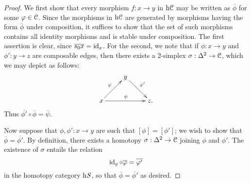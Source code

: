\begin{1.2.3 The homotopy category}
\begin{proof}
We first show that every morphism $f: x \rightarrow y$ in $\rm{h} \it{\operatorname{\mathcal{C}}}$ may be written as $\overline{\phi}$ for some $\varphi \in \operatorname{\mathcal{C}}$. Since the morphisms in $\rm{h} \it{\operatorname{\mathcal{C}}}$ are generated by morphisms having the form $\overline{\phi}$ under composition, it suffices to show that the set of such morphisms contains all identity morphisms and is stable under composition. The first assertion is clear, since $\overline{ s_0 x}=\operatorname{id}_x$. For the second, we note that if $\phi: x \rightarrow y$ and $\phi': y \rightarrow z$ are composable edges, then there exists a 2-simplex $\sigma: \Delta^2 \rightarrow \operatorname{\mathcal{C}}$, which we may depict as follows:
$$ \xymatrix{ & y \ar[dr]^{\phi'} & \\
x \ar[ur]^{\phi} \ar[rr]^{\psi} & & z. }$$
Thus $\overline{ \phi' } \circ \overline{\phi} = \overline{ \psi }$.

Now suppose that $\phi,\phi': x \rightarrow y$ are such that $[\phi]=[\phi']$; we wish to show that $\overline{\phi}=\overline{\phi'}$. By definition, there exists a homotopy $\sigma: \Delta^2 \rightarrow \operatorname{\mathcal{C}}$ joining $\phi$ and $\phi'$. The existence of $\sigma$ entails the relation
$$ \operatorname{id}_y \circ \overline{\varphi} = \overline{\varphi'} $$ in the homotopy category $\rm{h} \it{S}$, so that
$\overline{\phi} = \overline{\phi'}$ as desired.
\end{proof}
\end{1.2.3 The homotopy category}
